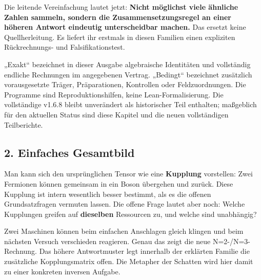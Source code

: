 Die leitende Vereinfachung lautet jetzt: \textbf{Nicht möglichst viele
ähnliche Zahlen sammeln, sondern die Zusammensetzungsregel an einer
höheren Antwort eindeutig unterscheidbar machen.} Das ersetzt keine
Quellherleitung. Es liefert ihr erstmals in diesen Familien einen
expliziten Rückrechnungs- und Falsifikationstest.

„Exakt`` bezeichnet in dieser Ausgabe algebraische Identitäten und
vollständig endliche Rechnungen im angegebenen Vertrag. „Bedingt``
bezeichnet zusätzlich vorausgesetzte Träger, Präparationen, Kontrollen
oder Feldzuordnungen. Die Programme sind Reproduktionshilfen, keine
Lean-Formalisierung. Die vollständige v1.6.8 bleibt unverändert als
historischer Teil enthalten; maßgeblich für den aktuellen Status sind
diese Kapitel und die neuen vollständigen Teilberichte.

\subsection{2. Einfaches Gesamtbild}\label{einfaches-gesamtbild}

Man kann sich den ursprünglichen Tensor wie eine \textbf{Kupplung}
vorstellen: Zwei Fermionen können gemeinsam in ein Boson übergehen und
zurück. Diese Kupplung ist intern wesentlich besser bestimmt, als es die
offenen Grundsatzfragen vermuten lassen. Die offene Frage lautet aber
noch: Welche Kupplungen greifen auf \textbf{dieselben} Ressourcen zu,
und welche sind unabhängig?

Zwei Maschinen können beim einfachen Anschlagen gleich klingen und beim
nächsten Versuch verschieden reagieren. Genau das zeigt die neue
N=2-/N=3-Rechnung. Das höhere Antwortmuster legt innerhalb der erklärten
Familie die zusätzliche Kopplungsmatrix offen. Die Metapher der Schatten
wird hier damit zu einer konkreten inversen Aufgabe.

